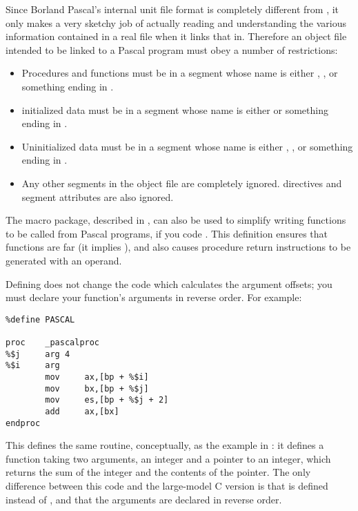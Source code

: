 Since Borland Pascal's internal unit file format is completely
different from , it only makes a very sketchy job of actually
reading and understanding the various information contained in a
real  file when it links that in. Therefore an object file
intended to be linked to a Pascal program must obey a number of
restrictions:

\begin{itemize}
    \item{Procedures and functions must be in a segment whose name is
        either , , or something ending in
        .}

    \item{initialized data must be in a segment whose name is either
         or something ending in .}

    \item{Uninitialized data must be in a segment whose name is either
        , , or something ending in .}

    \item{Any other segments in the object file are completely ignored.
         directives and segment attributes are also ignored.}
\end{itemize}



The  macro package, described in ,
can also be used to simplify writing functions to be called from Pascal
programs, if you code . This
definition ensures that functions are far (it implies ),
and also causes procedure return instructions to be generated with
an operand.

Defining  does not change the code which calculates the
argument offsets; you must declare your function's arguments in
reverse order. For example:

\begin{lstlisting}
%define PASCAL

proc    _pascalproc
%$j     arg 4
%$i     arg
        mov     ax,[bp + %$i]
        mov     bx,[bp + %$j]
        mov     es,[bp + %$j + 2]
        add     ax,[bx]
endproc
\end{lstlisting}

This defines the same routine, conceptually, as the example in
: it defines a function taking two arguments,
an integer and a pointer to an integer, which returns the sum of
the integer and the contents of the pointer. The only difference
between this code and the large-model C version is that 
is defined instead of , and that the arguments are
declared in reverse order.
